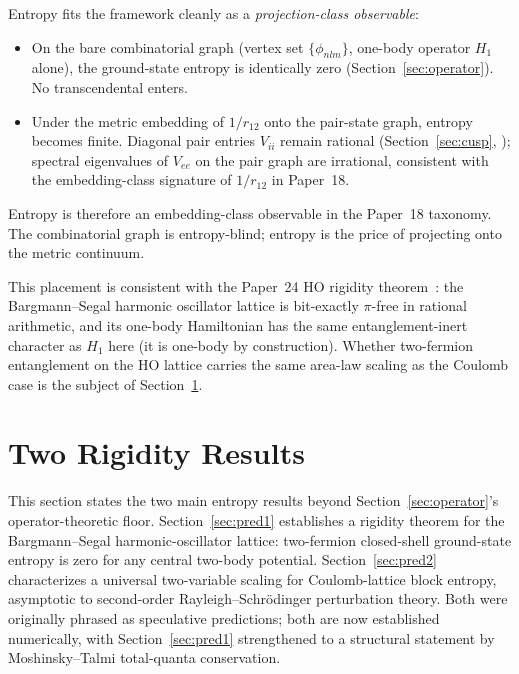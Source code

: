 \documentclass[twocolumn,pra,amsmath,amssymb,superscriptaddress]{revtex4-2}
\begin{document}
Entropy fits the framework cleanly as a
\emph{projection-class observable}:
\begin{itemize}
  \item On the bare combinatorial graph (vertex set
    $\{\phi_{nlm}\}$, one-body operator $H_1$ alone), the
    ground-state entropy is identically zero
    (Section~\ref{sec:operator}).  No transcendental enters.
  \item Under the metric embedding of $1/r_{12}$ onto the
    pair-state graph, entropy becomes finite.  Diagonal pair
    entries $V_{ii}$ remain rational
    (Section~\ref{sec:cusp}, \cite{EnergyGraph}); spectral
    eigenvalues of $V_{ee}$ on the pair graph are irrational,
    consistent with the embedding-class signature of $1/r_{12}$
    in Paper~18.
\end{itemize}
Entropy is therefore an embedding-class observable in the
Paper~18 taxonomy.  The combinatorial graph is entropy-blind;
entropy is the price of projecting onto the metric continuum.

This placement is consistent with the Paper~24 HO rigidity
theorem~\cite{GeoVac_Paper24}: the Bargmann--Segal harmonic
oscillator lattice is bit-exactly $\pi$-free in rational
arithmetic, and its one-body Hamiltonian has the same
entanglement-inert character as $H_1$ here (it is one-body by
construction).  Whether two-fermion entanglement on the HO
lattice carries the same area-law scaling as the Coulomb case
is the subject of Section~\ref{sec:predictions}.

\section{Two Rigidity Results}
\label{sec:predictions}

This section states the two main entropy results beyond
Section~\ref{sec:operator}'s operator-theoretic floor.
Section~\ref{sec:pred1} establishes a rigidity theorem for the
Bargmann--Segal harmonic-oscillator lattice: two-fermion
closed-shell ground-state entropy is zero for any central
two-body potential.  Section~\ref{sec:pred2} characterizes a
universal two-variable scaling for Coulomb-lattice block
entropy, asymptotic to second-order Rayleigh--Schr\"odinger
perturbation theory.  Both were originally phrased as
speculative predictions; both are now established
numerically, with Section~\ref{sec:pred1} strengthened to a
structural statement by Moshinsky--Talmi total-quanta
conservation.
\end{document}
